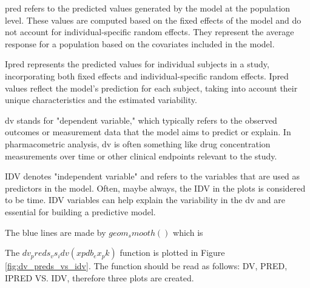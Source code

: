 pred refers to the predicted values generated by the model at the population level. These values are computed based on the fixed effects of the model and do not account for individual-specific random effects. They represent the average response for a population based on the covariates included in the model.

Ipred represents the predicted values for individual subjects in a study, incorporating both fixed effects and individual-specific random effects. Ipred values reflect the model's prediction for each subject, taking into account their unique characteristics and the estimated variability.

dv stands for "dependent variable," which typically refers to the observed outcomes or measurement data that the model aims to predict or explain. In pharmacometric analysis, dv is often something like drug concentration measurements over time or other clinical endpoints relevant to the study.

IDV denotes "independent variable" and refers to the variables that are used as predictors in the model. Often, maybe always, the IDV in the plots is considered to be time. IDV variables can help explain the variability in the dv and are essential for building a predictive model.

The blue lines are made by $geom_smooth()$ which is 

The $dv_preds_vs_idv(xpdb_ex_pk)$ function is plotted in Figure \ref{fig:dv_preds_vs_idv}. The function should be read as follows: DV, PRED, IPRED VS. IDV, therefore three plots are created. 














